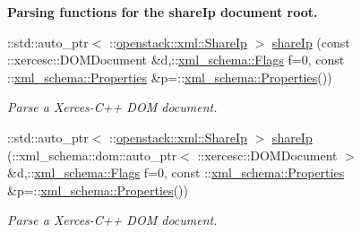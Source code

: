 \begin{Indent}{\bf Parsing functions for the shareIp document root.}
\begin{DoxyCompactItemize}
::std::auto\_\-ptr$<$ ::\hyperlink{classopenstack_1_1xml_1_1ShareIp}{openstack::xml::ShareIp} $>$ \hyperlink{namespaceopenstack_1_1xml_aaee8882bcaa568b8ae62df3419b6551a}{shareIp} (const ::xercesc::DOMDocument \&d,::\hyperlink{namespacexml__schema_affb4c227cbd9aa7453dd1dc5a1401943}{xml\_\-schema::Flags} f=0, const ::\hyperlink{namespacexml__schema_ad27ce19a7ee1d3b1064092648898f64c}{xml\_\-schema::Properties} \&p=::\hyperlink{namespacexml__schema_ad27ce19a7ee1d3b1064092648898f64c}{xml\_\-schema::Properties}())
\begin{DoxyCompactList}\small\item\em Parse a Xerces-\/C++ DOM document. \item\end{DoxyCompactList}\item 
::std::auto\_\-ptr$<$ ::\hyperlink{classopenstack_1_1xml_1_1ShareIp}{openstack::xml::ShareIp} $>$ \hyperlink{namespaceopenstack_1_1xml_ab3260b10951232f15ffc1ac7d2df7710}{shareIp} (::xml\_\-schema::dom::auto\_\-ptr$<$ ::xercesc::DOMDocument $>$ \&d,::\hyperlink{namespacexml__schema_affb4c227cbd9aa7453dd1dc5a1401943}{xml\_\-schema::Flags} f=0, const ::\hyperlink{namespacexml__schema_ad27ce19a7ee1d3b1064092648898f64c}{xml\_\-schema::Properties} \&p=::\hyperlink{namespacexml__schema_ad27ce19a7ee1d3b1064092648898f64c}{xml\_\-schema::Properties}())
\begin{DoxyCompactList}\small\item\em Parse a Xerces-\/C++ DOM document. \item\end{DoxyCompactList}\end{DoxyCompactItemize}
\end{Indent}
